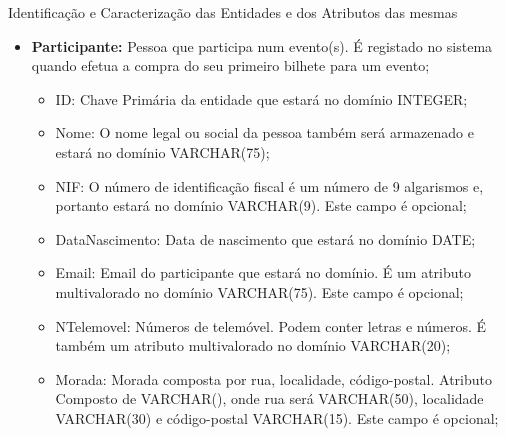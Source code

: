\documentclass[compress,svgnames,handout,13.7pt]{beamer}
\begin{document}
\begin{frame}{Identificação e Caracterização das Entidades e dos Atributos das mesmas}
\begin{itemize}
                 \item{\textbf{Participante:}} Pessoa que participa num evento(s). É registado no sistema quando efetua a compra do seu primeiro bilhete para um evento;
                     \begin{itemize}
                     \item{ID:} Chave Primária da entidade que estará no domínio INTEGER;
                       
                     \item{Nome:} O nome legal ou social da pessoa também será armazenado e estará
                       no domínio VARCHAR(75);
                       
                     \item{NIF:} O número de identificação fiscal é um número de 9 algarismos e, portanto estará no domínio VARCHAR(9). Este campo é opcional;
                       
                     \item{DataNascimento:} Data de nascimento que estará no domínio DATE;
                       
                     \item{Email:} Email do participante que estará no domínio. É um atributo multivalorado no domínio VARCHAR(75). Este campo é opcional;
                       
                     \item{NTelemovel:} Números de telemóvel. Podem conter letras e números. É também um atributo multivalorado no domínio VARCHAR(20);
                       
                     \item{Morada:} Morada composta por rua, localidade, código-postal. Atributo Composto de VARCHAR(), onde rua será VARCHAR(50), localidade VARCHAR(30) e código-postal VARCHAR(15). Este campo é opcional;
                       
                     \end{itemize}
\end{itemize}
\end{frame}
\end{document}
